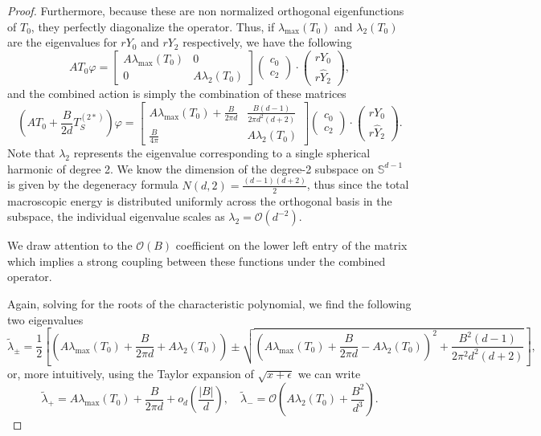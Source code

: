 \begin{proof}
    Furthermore, because these are non normalized orthogonal eigenfunctions of $T_0$, they perfectly diagonalize the operator. Thus, if $\lambda_{\max}(T_0)$ and $\lambda_2(T_0)$ are the eigenvalues for $r Y_0$ and $rY_2$ respectively, we have the following
    \[
        AT_0 \varphi = \begin{bmatrix}
            A\lambda_{\max}(T_0) & 0\\
            0 & A\lambda_2(T_0)
        \end{bmatrix} \begin{pmatrix}
            c_0\\
            c_2
        \end{pmatrix} \cdot \begin{pmatrix}
            r Y_0\\
            r \hat{Y}_2
        \end{pmatrix},
    \]
    and the combined action is simply the combination of these matrices
    \[
        \left( AT_0 + \frac{B}{2d}T_{S}^{(2*)} \right) \varphi = \begin{bmatrix}
            A\lambda_{\max}(T_0) + \frac{B}{2\pi d} & \frac{B(d-1)}{2 \pi d^2(d+2)}\\
            \frac{B}{4 \pi } & A\lambda_2(T_0)
        \end{bmatrix} \begin{pmatrix}
            c_0\\
            c_2
        \end{pmatrix} \cdot \begin{pmatrix}
            r Y_0\\
            r \hat{Y}_2
        \end{pmatrix} .
    \]
    Note that $\lambda_2$ represents the eigenvalue corresponding to a single spherical harmonic of degree 2. We know the dimension of the degree-2 subspace on $\mathbb {S}^{d-1}$ is given by the degeneracy formula $N(d, 2) = \frac{(d-1)(d+2)}{2}$, thus since the total macroscopic energy is distributed uniformly across the orthogonal basis in the subspace, the individual eigenvalue scales as $\lambda_2 = \mathcal{O}(d^{-2})$. 

    We draw attention to the $\mathcal O(B)$ coefficient on the lower left entry of the matrix which implies a strong coupling between these functions under the combined operator.
    
    Again, solving for the roots of the characteristic polynomial, we find the following two eigenvalues
    \[
        \tilde{\lambda}_{\pm} = \frac{1}{2} \left[ \left( A \lambda_{\max}(T_0) + \frac{B}{2 \pi d} + A \lambda_2(T_0) \right) \pm \sqrt{ \left( A \lambda_{\max}(T_0) + \frac{B}{2 \pi d} - A \lambda_2(T_0) \right)^2 + \frac{B^2(d-1)}{2 \pi^2 d^2(d+2)} } \right],
    \]
    or, more intuitively, using the Taylor expansion of $\sqrt{x + \epsilon}$ we can write
    \[
        \tilde{\lambda}_+ = A\lambda_{\max}(T_0) + \frac{B}{2 \pi d} + o_d\left(\frac{|B|}{d}\right), \quad \tilde{\lambda}_- = \mathcal O\left( A\lambda_2(T_0) + \frac{B^2}{d^3}\right).
    \]
    

\end{proof}
